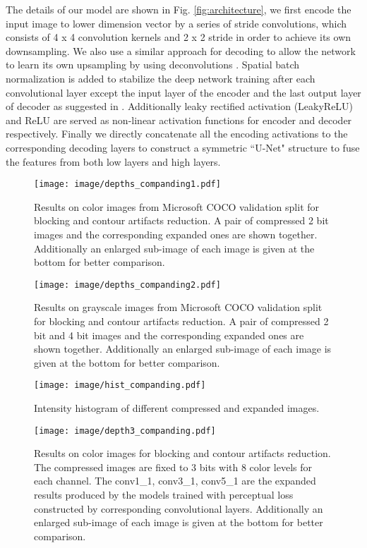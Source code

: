 \documentclass[journal]{IEEEtran}
\begin{document}
The details of our model are shown in Fig. \ref{fig:architecture}, we first encode the input image to lower dimension vector by a series of stride convolutions, which consists of 4 x 4 convolution kernels and 2 x 2 stride in order to achieve its own downsampling. We also use a similar approach for decoding to allow the network to learn its own upsampling by using deconvolutions \cite{long2015fully}. Spatial batch normalization \cite{ioffe2015batch} is added to stabilize the deep network training after each convolutional layer except the input layer of the encoder and the last output layer of decoder as suggested in \cite{radford2015unsupervised}. Additionally leaky rectified activation (LeakyReLU) and ReLU are served as non-linear activation functions for encoder and decoder respectively. Finally we directly concatenate all the encoding activations to the corresponding decoding layers to construct a symmetric ``U-Net" structure \cite{ronneberger2015u} to fuse the features from both low layers and high layers.

\begin{figure*}
\centering
  \texttt{[image: image/depths\_companding1.pdf]}
  \caption{Results on color images from Microsoft COCO validation split for blocking and contour artifacts reduction. A pair of compressed 2 bit images and the corresponding expanded ones are shown together. Additionally an enlarged sub-image of each image is given at the bottom for better comparison.}
  \label{fig:depths_companding1}
\end{figure*}

\begin{figure*}
\centering
  \texttt{[image: image/depths\_companding2.pdf]}
  \caption{Results on grayscale images from Microsoft COCO validation split for blocking and contour artifacts reduction. A pair of compressed 2 bit and 4 bit images and the corresponding expanded ones are shown together. Additionally an enlarged sub-image of each image is given at the bottom for better comparison.}
  \label{fig:depths_companding2}
\end{figure*}

\begin{figure}[!tb]
  \centering
  \texttt{[image: image/hist\_companding.pdf]}
  \caption{Intensity histogram of different compressed and expanded images.}
  \label{fig:hist_companding}
\end{figure}

\begin{figure*}[!tb]
  \centering
  \texttt{[image: image/depth3\_companding.pdf]}
  \caption{Results on color images for blocking and contour artifacts reduction. The compressed images are fixed to 3 bits with 8 color levels for each channel. The conv1\_1, conv3\_1, conv5\_1 are the expanded results produced by the models trained with perceptual loss constructed by corresponding convolutional layers. Additionally an enlarged sub-image of each image is given at the bottom for better comparison.}
  \label{fig:depth3_companding}
\end{figure*}
\end{document}
